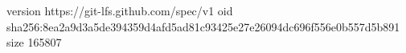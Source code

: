 version https://git-lfs.github.com/spec/v1
oid sha256:8ea2a9d3a5de394359d4afd5ad81c93425e27e26094dc696f556e0b557d5b891
size 165807
